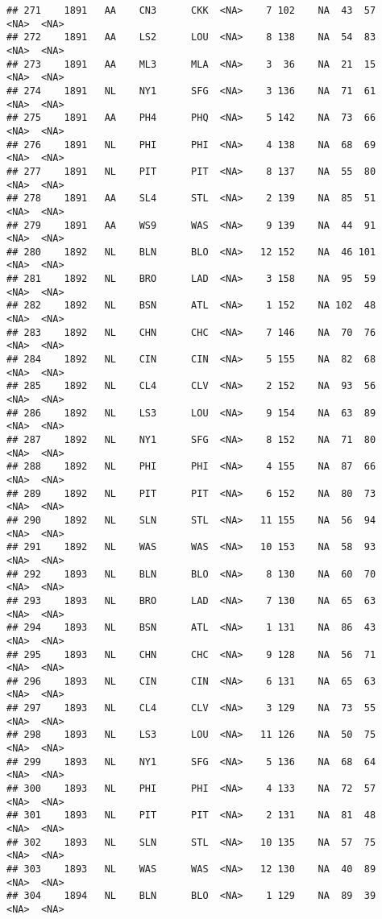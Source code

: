 \documentclass[]{article}
\begin{document}
\begin{verbatim}
## 271    1891   AA    CN3      CKK  <NA>    7 102    NA  43  57   <NA>  <NA>
## 272    1891   AA    LS2      LOU  <NA>    8 138    NA  54  83   <NA>  <NA>
## 273    1891   AA    ML3      MLA  <NA>    3  36    NA  21  15   <NA>  <NA>
## 274    1891   NL    NY1      SFG  <NA>    3 136    NA  71  61   <NA>  <NA>
## 275    1891   AA    PH4      PHQ  <NA>    5 142    NA  73  66   <NA>  <NA>
## 276    1891   NL    PHI      PHI  <NA>    4 138    NA  68  69   <NA>  <NA>
## 277    1891   NL    PIT      PIT  <NA>    8 137    NA  55  80   <NA>  <NA>
## 278    1891   AA    SL4      STL  <NA>    2 139    NA  85  51   <NA>  <NA>
## 279    1891   AA    WS9      WAS  <NA>    9 139    NA  44  91   <NA>  <NA>
## 280    1892   NL    BLN      BLO  <NA>   12 152    NA  46 101   <NA>  <NA>
## 281    1892   NL    BRO      LAD  <NA>    3 158    NA  95  59   <NA>  <NA>
## 282    1892   NL    BSN      ATL  <NA>    1 152    NA 102  48   <NA>  <NA>
## 283    1892   NL    CHN      CHC  <NA>    7 146    NA  70  76   <NA>  <NA>
## 284    1892   NL    CIN      CIN  <NA>    5 155    NA  82  68   <NA>  <NA>
## 285    1892   NL    CL4      CLV  <NA>    2 152    NA  93  56   <NA>  <NA>
## 286    1892   NL    LS3      LOU  <NA>    9 154    NA  63  89   <NA>  <NA>
## 287    1892   NL    NY1      SFG  <NA>    8 152    NA  71  80   <NA>  <NA>
## 288    1892   NL    PHI      PHI  <NA>    4 155    NA  87  66   <NA>  <NA>
## 289    1892   NL    PIT      PIT  <NA>    6 152    NA  80  73   <NA>  <NA>
## 290    1892   NL    SLN      STL  <NA>   11 155    NA  56  94   <NA>  <NA>
## 291    1892   NL    WAS      WAS  <NA>   10 153    NA  58  93   <NA>  <NA>
## 292    1893   NL    BLN      BLO  <NA>    8 130    NA  60  70   <NA>  <NA>
## 293    1893   NL    BRO      LAD  <NA>    7 130    NA  65  63   <NA>  <NA>
## 294    1893   NL    BSN      ATL  <NA>    1 131    NA  86  43   <NA>  <NA>
## 295    1893   NL    CHN      CHC  <NA>    9 128    NA  56  71   <NA>  <NA>
## 296    1893   NL    CIN      CIN  <NA>    6 131    NA  65  63   <NA>  <NA>
## 297    1893   NL    CL4      CLV  <NA>    3 129    NA  73  55   <NA>  <NA>
## 298    1893   NL    LS3      LOU  <NA>   11 126    NA  50  75   <NA>  <NA>
## 299    1893   NL    NY1      SFG  <NA>    5 136    NA  68  64   <NA>  <NA>
## 300    1893   NL    PHI      PHI  <NA>    4 133    NA  72  57   <NA>  <NA>
## 301    1893   NL    PIT      PIT  <NA>    2 131    NA  81  48   <NA>  <NA>
## 302    1893   NL    SLN      STL  <NA>   10 135    NA  57  75   <NA>  <NA>
## 303    1893   NL    WAS      WAS  <NA>   12 130    NA  40  89   <NA>  <NA>
## 304    1894   NL    BLN      BLO  <NA>    1 129    NA  89  39   <NA>  <NA>

\end{verbatim}
\end{document}
